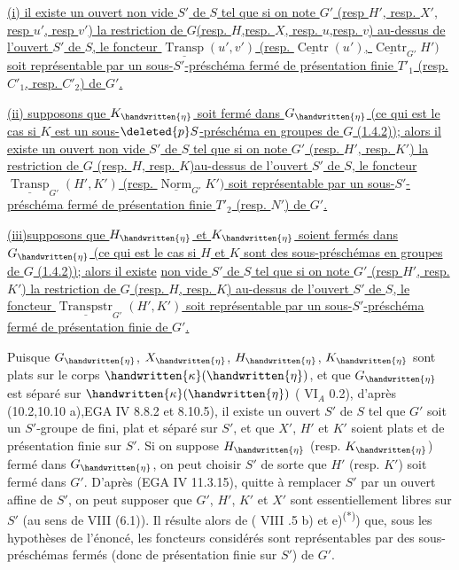 \uline{(i) il existe un ouvert non vide $S'$ de $S$ tel que si on note $G'$ (resp $H'$, resp. $X'$, resp $u'$, resp $v'$) la restriction de $G$(resp. $H$,resp. $X$, resp. $u$,resp. $v$) au-dessus de l'ouvert $S'$ de $S$, le foncteur $\underline{\operatorname{Transp}}(u',v')$ (resp. $\underline{\operatorname{Centr}}(u')$, $\underline{\operatorname{Centr}}_{G'}H')$ soit représentable par un sous-$S'$-préschéma fermé de présentation finie $T'_1$ (resp. $C'_1$, resp. $C'_2$) de $G'$.}

\uline{(ii) supposons que $K_{\handwritten{\eta}}$ soit fermé dans $G_{\handwritten{\eta}}$ (ce qui est le cas si $K$ est un sous-$\deleted{p}S$-préschéma en groupes de $G$ (1.4.2)); alors il existe un ouvert non vide $S'$ de $S$ tel que si on note $G'$ (resp. $H'$, resp. $K'$) la restriction de $G$ (resp. $H$, resp. $K$)au-dessus de l'ouvert $S'$ de $S$, le foncteur $\underline{\operatorname{Transp}}_{G'}(H',K')$ (resp. $\underline{\operatorname{Norm}}_{G'}K')$ soit représentable par un sous-$S'$-préschéma fermé de présentation finie $T'_2$ (resp. $N'$) de $G'$.}

\uline{(iii)supposons que $H_{\handwritten{\eta}}$ et $K_{\handwritten{\eta}}$ soient fermés dans $G_{\handwritten{\eta}}$ (ce qui est le cas si $H$ et $K$ sont des sous-préschémas en groupes de $G$ (1.4.2)); alors il existe}  \uline{non vide $S'$ de $S$ tel que si on note $G'$ (resp $H'$, resp. $K'$) la restriction de $G$ (resp. $H$, resp. $K$) au-dessus de l'ouvert $S'$ de $S$, le foncteur $\underline{\operatorname{Transpstr}}_{G'}(H',K')$ soit représentable par un sous-$S'$-préschéma fermé de présentation finie de $G'$.}

Puisque $G_{\handwritten{\eta}}$, $X_{\handwritten{\eta}}$, $H_{\handwritten{\eta}}$, $K_{\handwritten{\eta}}$ sont plats sur le corps $\handwritten{\kappa}(\handwritten{\eta})$, et que
$G_{\handwritten{\eta}}$ est séparé sur $\handwritten{\kappa}(\handwritten{\eta})$ ( $\mathrm{VI}_A$ 0.2), d'après (10.2,10.10 a),EGA IV 8.8.2 et 8.10.5), il existe un ouvert $S'$ de $S$ tel que $G'$ soit un $S'$-groupe de  fini, plat et séparé sur $S'$, et que $X'$, $H'$ et $K'$ soient plats et de présentation finie sur $S'$. Si on suppose $H_{\handwritten{\eta}}$ (resp. $K_{\handwritten{\eta}}$) fermé dans $G_{\handwritten{\eta}}$, on peut choisir $S'$ de sorte que $H'$ (resp. $K'$) soit fermé dans $G'$. D'après (EGA IV 11.3.15), quitte à remplacer $S'$ par un ouvert affine de $S'$, on peut supposer que $G'$, $H'$, $K'$ et $X'$ sont essentiellement libres sur $S'$ (au sens de  VIII (6.1)). Il résulte alors de ( VIII .5 b) et e)\textsuperscript{(*)}) que, sous les hypothèses de l'énoncé, les foncteurs considérés sont représentables par des sous-préschémas fermés (donc de présentation finie sur $S'$) de $G'$.

